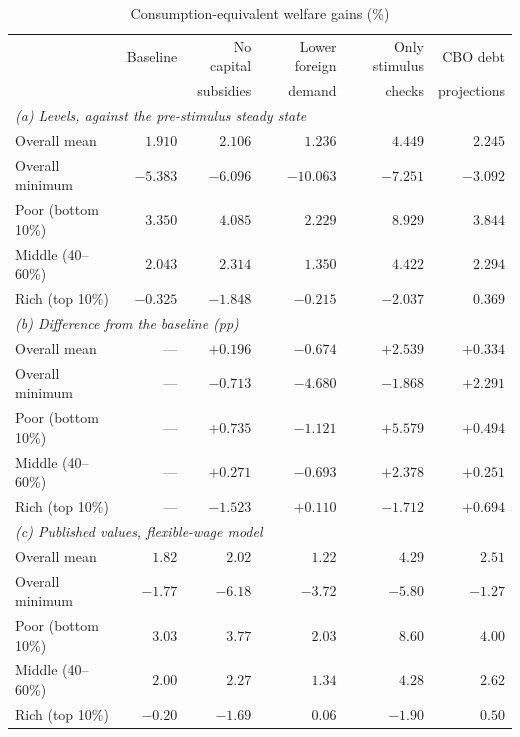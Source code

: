 \begin{table}[t]\centering
\caption{Consumption-equivalent welfare gains (\%)}\label{tab:table6}
\small
\begin{tabular}{lrrrrr}
\toprule
 & Baseline & No capital & Lower foreign & Only stimulus & CBO debt \\
 &          & subsidies  & demand        & checks        & projections \\
\midrule
\multicolumn{6}{l}{\textit{(a) Levels, against the pre-stimulus steady state}}\\
Overall mean       & $1.910$ & $2.106$ & $1.236$  & $4.449$ & $2.245$ \\
Overall minimum    & $-5.383$& $-6.096$& $-10.063$& $-7.251$& $-3.092$ \\
Poor (bottom 10\%) & $3.350$ & $4.085$ & $2.229$  & $8.929$ & $3.844$ \\
Middle (40--60\%)  & $2.043$ & $2.314$ & $1.350$  & $4.422$ & $2.294$ \\
Rich (top 10\%)    & $-0.325$& $-1.848$& $-0.215$ & $-2.037$& $0.369$ \\
\midrule
\multicolumn{6}{l}{\textit{(b) Difference from the baseline (pp)}}\\
Overall mean       & --- & $+0.196$ & $-0.674$ & $+2.539$ & $+0.334$ \\
Overall minimum    & --- & $-0.713$ & $-4.680$ & $-1.868$ & $+2.291$ \\
Poor (bottom 10\%) & --- & $+0.735$ & $-1.121$ & $+5.579$ & $+0.494$ \\
Middle (40--60\%)  & --- & $+0.271$ & $-0.693$ & $+2.378$ & $+0.251$ \\
Rich (top 10\%)    & --- & $-1.523$ & $+0.110$ & $-1.712$ & $+0.694$ \\
\midrule
\multicolumn{6}{l}{\textit{(c) Published values, flexible-wage model}}\\
Overall mean       & $1.82$ & $2.02$ & $1.22$ & $4.29$ & $2.51$ \\
Overall minimum    & $-1.77$& $-6.18$& $-3.72$& $-5.80$& $-1.27$ \\
Poor (bottom 10\%) & $3.03$ & $3.77$ & $2.03$ & $8.60$ & $4.00$ \\
Middle (40--60\%)  & $2.00$ & $2.27$ & $1.34$ & $4.28$ & $2.62$ \\
Rich (top 10\%)    & $-0.20$& $-1.69$& $0.06$ & $-1.90$& $0.50$ \\
\bottomrule
\end{tabular}
\end{table}

